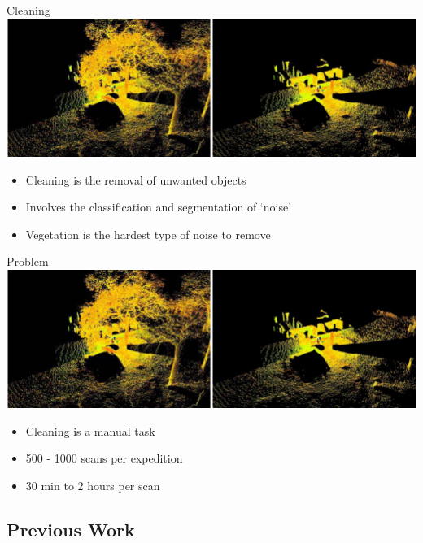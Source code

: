 \documentclass{beamer}
\begin{document}
\begin{frame}{Cleaning}
  \includegraphics[width=1\textwidth]{pics/cleaning.png}
  \begin{itemize}
  \item
  Cleaning is the removal of unwanted objects
  \item
  Involves the classification and segmentation of `noise'
  \item
  Vegetation is the hardest type of noise to remove
  \end{itemize}
\end{frame}

\begin{frame}{Problem}
  \includegraphics[width=1\textwidth]{pics/cleaning.png}
  \begin{itemize}
  \item
  Cleaning is a manual task
  \item
  500 - 1000 scans per expedition
  \item
  30 min to 2 hours per scan
  \end{itemize}
\end{frame}

\subsection{Previous Work}
\end{document}
